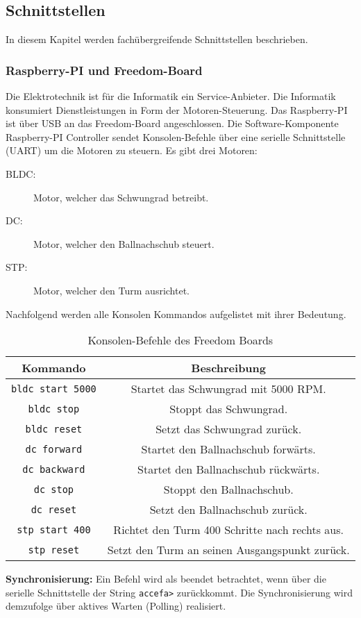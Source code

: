\subsection{Schnittstellen}
In diesem Kapitel werden fachübergreifende Schnittstellen beschrieben.

\subsubsection{Raspberry-PI und Freedom-Board}
\label{sec:schnittstelle-raspi-freedom}
Die Elektrotechnik ist für die Informatik ein Service-Anbieter. Die Informatik konsumiert Dienstleistungen in Form der Motoren-Steuerung. Das Raspberry-PI ist über USB an das Freedom-Board angeschlossen. Die Software-Komponente Raspberry-PI Controller sendet Konsolen-Befehle über eine serielle Schnittstelle (UART) um die Motoren zu steuern. Es gibt drei Motoren:

\begin{description}
	\item[BLDC:] Motor, welcher das Schwungrad betreibt.
	\item[DC:] Motor, welcher den Ballnachschub steuert.
	\item[STP:] Motor, welcher den Turm ausrichtet.
\end{description}

\noindent
Nachfolgend werden alle Konsolen Kommandos aufgelistet mit ihrer Bedeutung. \\

\begin{table}[h!]
	\centering
	\renewcommand{\arraystretch}{1.5}
	\begin{tabular}{|c|c|}
		\hline \textbf{Kommando}  & \textbf{Beschreibung} \\ 
		\hline \texttt{bldc start 5000}  & Startet das Schwungrad mit 5000 RPM. \\ 
		\hline \texttt{bldc stop} & Stoppt das Schwungrad.  \\ 
		\hline \texttt{bldc reset} & Setzt das Schwungrad zurück. \\ 
		\hline \texttt{dc forward} & Startet den Ballnachschub forwärts. \\ 
		\hline \texttt{dc backward} & Startet den Ballnachschub rückwärts. \\ 
		\hline \texttt{dc stop} & Stoppt den Ballnachschub. \\ 
	    \hline \texttt{dc reset} & Setzt den Ballnachschub zurück. \\ 
	    \hline \texttt{stp start 400} & Richtet den Turm 400 Schritte nach rechts aus. \\ 
	    \hline \texttt{stp reset} & Setzt den Turm an seinen Ausgangspunkt zurück. \\ 
		\hline 
	\end{tabular} 
	\caption{Konsolen-Befehle des Freedom Boards}
	\label{tab:freedom-board-konsolen-befehle}
\end{table}

\noindent
\textbf{Synchronisierung:} Ein Befehl wird als beendet betrachtet, wenn über die serielle Schnittstelle der String \texttt{accefa>} zurückkommt. Die Synchronisierung wird demzufolge über aktives Warten (Polling) realisiert.
